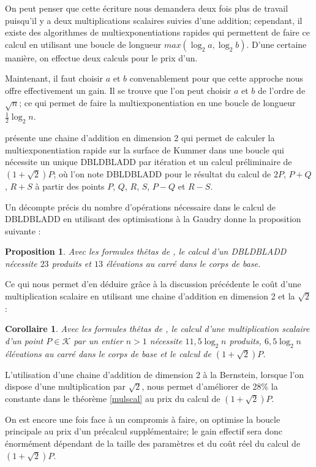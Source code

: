 \documentclass[a4paper,12pt]{article}
\newtheorem{proposition}[theoreme]{Proposition}
\newtheorem{corollaire}[theoreme]{Corollaire}
\theoremstyle{definition}
\theoremstyle{remark}
\numberwithin{equation}{section}
\begin{document}
On peut penser que cette écriture nous demandera deux fois plus de travail puisqu'il y a deux multiplications scalaires suivies d'une addition; cependant, il existe des algorithmes de multiexponentiations rapides qui permettent de faire ce calcul en utilisant une boucle de longueur $max(\log_2 a, \log_2 b)$. D'une certaine manière, on effectue deux calculs pour le prix d'un.

Maintenant, il faut choisir $a$ et $b$ convenablement pour que cette approche nous offre effectivement un gain. Il se trouve que l'on peut choisir $a$ et $b$ de l'ordre de $\sqrt{n}$; ce qui permet de faire la multiexponentiation en une boucle de longueur $\frac{1}{2}\log_2 n$.

\citet{bernstein} présente une chaine d'addition en dimension 2 qui permet de calculer la multiexponentiation rapide sur la surface de Kummer dans une boucle qui nécessite un unique DBLDBLADD par itération et un calcul préliminaire de $(1+\sqrt{2})P$; où l'on note DBLDBLADD pour le résultat du calcul de $2P$, $P+Q$, $R+S$ à partir des points $P$, $Q$, $R$, $S$, $P-Q$ et $R-S$.

Un décompte précis du nombre d'opérations nécessaire dans le calcul de DBLDBLADD en utilisant des optimisations à la Gaudry donne la proposition suivante :
\begin{proposition}
Avec les formules thêtas de \citep{gaudry}, le calcul d'un DBLDBLADD nécessite $23$ produits et $13$ élévations au carré dans le corps de base.
\end{proposition}

Ce qui nous permet d'en déduire grâce à la discussion précédente le coût d'une multiplication scalaire en utilisant une chaine d'addition en dimension 2 et la $\sqrt{2}$ :
\begin{corollaire}
Avec les formules thêtas de \citep{gaudry}, le calcul d'une multiplication scalaire d'un point $P \in \mathcal{K}$ par un entier $n > 1$ nécessite $11,5\log_2 n$ produits, $6,5\log_2 n$ élévations au carré dans le corps de base et le calcul de $(1+\sqrt{2})P$.
\end{corollaire}

L'utilisation d'une chaine d'addition de dimension 2 à la Bernstein, lorsque l'on dispose d'une multiplication par $\sqrt{2}$, nous permet d'améliorer de 28\% la constante dans le théorème \ref{mulscal} au prix du calcul de $(1+\sqrt{2})P$.

On est encore une fois face à un compromis à faire, on optimise la boucle principale au prix d'un précalcul supplémentaire; le gain effectif sera donc énormément dépendant de la taille des paramètres et du coût réel du calcul de $(1+\sqrt{2})P$.
\end{document}
